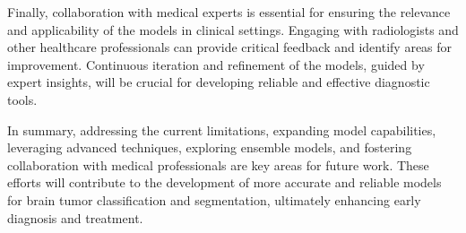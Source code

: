 Finally, collaboration with medical experts is essential for ensuring the relevance and applicability of the models in clinical settings. Engaging with radiologists and other healthcare professionals can provide critical feedback and identify areas for improvement. Continuous iteration and refinement of the models, guided by expert insights, will be crucial for developing reliable and effective diagnostic tools.

In summary, addressing the current limitations, expanding model capabilities, leveraging advanced techniques, exploring ensemble models, and fostering collaboration with medical professionals are key areas for future work. These efforts will contribute to the development of more accurate and reliable models for brain tumor classification and segmentation, ultimately enhancing early diagnosis and treatment.


